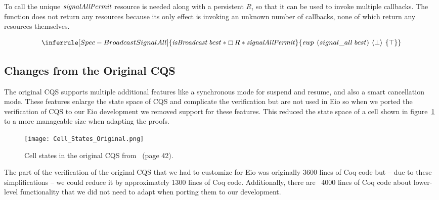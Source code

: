 \subsubsection{}
\label{sec:broadcast-spec-signal-all}

To call  the unique \(\mathit{signalAllPermit}{}\) resource is needed along with a persistent \(R\), so that it can be used to invoke multiple callbacks.
The function does not return any resources because its only effect is invoking an unknown number of callbacks, none of which return any resources themselves.

\[
  \inferrule[Spec-BroadcastSignalAll]
  { \gsIsBcst{}\; bcst \ast \always R \ast \gssignal{}}
  { \ewp{signal\_all\; bcst}{\bot}{\top} }
\]

\subsection{Changes from the Original CQS}
\label{sec:broadcast-spec-removed-features}

The original CQS supports multiple additional features like a synchronous mode for suspend and resume, and also a smart cancellation mode.
These features enlarge the state space of CQS and complicate the verification but are not used in Eio so when we ported the verification of CQS to our Eio development we removed support for these features.
This reduced the state space of a cell shown in figure~\ref{fig:cqs-cell-states-original} to a more manageable size when adapting the proofs.

\begin{figure}[ht]
  \texttt{[image: Cell\_States\_Original.png]}
  \caption{Cell states in the original CQS from~\cite{koval2023cqs} (page 42).}
  \label{fig:cqs-cell-states-original}
\end{figure}

The part of the verification of the original CQS that we had to customize for Eio was originally 3600 lines of Coq code but -- due to these simplifications -- we could reduce it by approximately 1300 lines of Coq code.
Additionally, there are ~4000 lines of Coq code about lower-level functionality that we did not need to adapt when porting them to our development.




